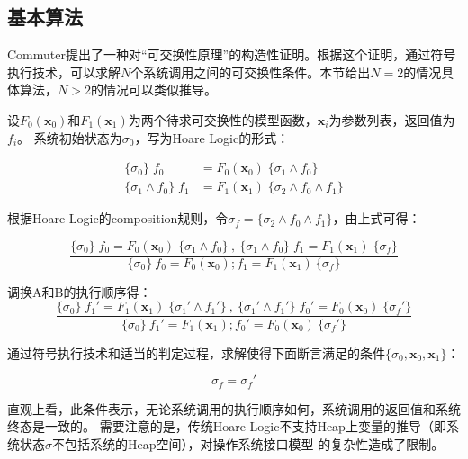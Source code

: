 \subsection{基本算法}
\label{subsec:comm-alg}
Commuter\cite{commuter:2013}提出了一种对``可交换性原理''的构造性证明。根据这个证明，通过符号执行技术，可以求解$N$个系统调用之间的可交换性条件。本节给出$N=2$的情况具体算法，$N
> 2$的情况可以类似推导。

设$F_0(\boldsymbol{x}_0)$和$F_1(\boldsymbol{x}_1)$为两个待求可交换性的模型函数，$\boldsymbol{x}_i$为参数列表，返回值为$f_i$。
系统初始状态为$\sigma_0$，写为Hoare Logic\cite{Hoare:ABC:363235.363259}的形式：

\begin{equation}
\label{eq:hoare1}
\begin{aligned}
\{ \sigma_0 \} \; f_0 &= F_0(\boldsymbol{x}_0) \; \{\sigma_1 \land f_0 \} \\
\{ \sigma_1 \land f_0 \} \; f_1 &= F_1(\boldsymbol{x}_1) \; \{\sigma_2 \land f_0 \land
	f_1 \}
\end{aligned}
\end{equation}

根据Hoare Logic的composition规则，令$\sigma_f = \{\sigma_2 \land f_0 \land
	f_1 \}$，由上式可得：

\begin{equation}
\label{eq:hoare2}
\frac
{ \{ \sigma_0 \} \; f_0 = F_0(\boldsymbol{x}_0) \; \{\sigma_1 \land f_0 \}\ , \
\{ \sigma_1 \land f_0 \} \; f_1 = F_1(\boldsymbol{x}_1) \; \{ \sigma_f \} }
{\{ \sigma_0 \}\ f_0 = F_0(\boldsymbol{x}_0);f_1 = F_1(\boldsymbol{x}_1) \ \{ \sigma_f
\}}
\end{equation}

调换A和B的执行顺序得：
\begin{equation}
\label{eq:hoare3}
\frac
{ \{ \sigma_0 \} \; f_1' = F_1(\boldsymbol{x}_1) \; \{\sigma_1' \land f_1' \}\ , \
\{ \sigma_1' \land f_1' \} \; f_0' = F_0(\boldsymbol{x}_0) \; \{ \sigma_f' \} }
{\{ \sigma_0 \}\ f_1' = F_1(\boldsymbol{x}_1);f_0' = F_0(\boldsymbol{x}_0) \
\{ \sigma_f' \}}
\end{equation}

通过符号执行技术和适当的判定过程，求解使得下面断言满足的条件$\{\sigma_0,\boldsymbol{x}_0,
\boldsymbol{x}_1\}$：

\begin{equation}
\label{eq:hoare4}
\sigma_f = \sigma_f'
\end{equation}

直观上看，此条件表示，无论系统调用的执行顺序如何，系统调用的返回值和系统终态是一致的。
需要注意的是，传统Hoare
Logic不支持Heap上变量的推导（即系统状态$\sigma$不包括系统的Heap空间），对操作系统接口模型
的复杂性造成了限制。

